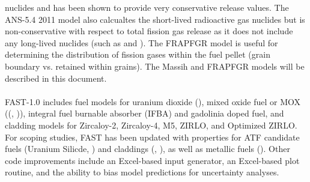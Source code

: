 nuclides and has been shown to provide very conservative release values. The ANS-5.4 2011 model also
calcualtes the short-lived radioactive gas nuclides but is non-conservative with respect to total
fission gas release as it does not include any long-lived nuclides (such as  and
).  The FRAPFGR model is useful for determining the distribution of fission gases
within the fuel pellet (grain boundary vs. retained within grains). The Massih and FRAPFGR models
will be described in this document.
\\
\\
FAST-1.0 includes fuel models for uranium dioxide (\UO), mixed oxide fuel or MOX ((,
)), integral fuel burnable absorber (IFBA) and gadolinia doped fuel, and
cladding models for Zircaloy-2, Zircaloy-4, M5, ZIRLO, and Optimized ZIRLO.  For scoping studies,
FAST has been updated with properties for ATF candidate fuels (Uranium Silicde,
) and claddings (, ), as well as
metallic fuels ().  Other code improvements include an Excel-based input generator,
an Excel-based plot routine, and the ability to bias model predictions for uncertainty analyses.
